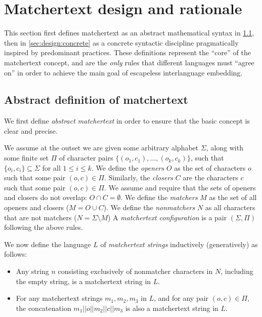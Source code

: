 \section{Matchertext design and rationale}
\label{sec:design}

This section first defines matchertext 
as an abstract mathematical syntax in \cref{sec:design:abstract},
then in \cref{sec:design:concrete}
as a concrete syntactic discipline
pragmatically inspired by predominant practices.
These definitions represent the ``core'' of the matchertext concept,
and are the \emph{only} rules
that different languages must ``agree on''
in order to achieve the main goal of escapeless interlanguage embedding.

\subsection{Abstract definition of matchertext}
\label{sec:design:abstract}

We first define \emph{abstract matchertext}
in order to ensure that the basic concept is clear and precise.

We assume at the outset we are given some arbitrary alphabet $\Sigma$,
along with some finite set $\Pi$ of character pairs 
$\{(o_1,c_1),\dots,(o_k,c_k)\}$,
such that $\{o_i, c_i\} \subseteq \Sigma$ for all $1 \le i \le k$.
We define the \emph{openers} $O$ as the set of characters $o$
such that some pair $(o, c) \in \Pi$.
Similarly, the \emph{closers} $C$ are the characters $c$
such that some pair $(o, c) \in \Pi$.
We assume and require that the sets of openers and closers do not overlap:
\ie $O \cap C = \emptyset$.
We define the \emph{matchers} $M$ as the set of all openers and closers
(\ie $M = O \cup C$).
We define the \emph{nonmatchers} $N$ as
all characters that are not matchers
(\ie $N = \Sigma \setminus M$)
A \emph{matchertext configuration}
is a pair $(\Sigma, \Pi)$ following the above rules.

We now define the language $L$ of \emph{matchertext strings}
inductively (\ie generatively) as follows:
\begin{itemize}
\item	Any string $n$ consisting exclusively of nonmatcher characters in $N$,
	including the empty string,
	is a matchertext string in $L$.
\item	For any matchertext strings $m_1,m_2,m_3$ in $L$,
	and for any pair $(o,c) \in \Pi$,
	the concatenation $m_1||o||m_2||c||m_3$
	is also a matchertext string in $L$.
\end{itemize}

